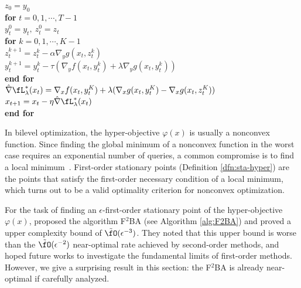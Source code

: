 \documentclass{article}
\begin{document}
\begin{algorithm*}[t]  
\caption{F${}^2$BA $\left(x_0,y_0, \eta,\tau,\alpha, \lambda, T,K\right)$} \label{alg:F2BA}
\begin{algorithmic}[1] 
\STATE $ z_0 = y_0$ \\[1mm]
\STATE \textbf{for} $ t =0,1,\cdots,T-1 $ \\[1mm]
\STATE \quad $ y_t^0 =  y_{t}, ~ z_t^0 = z_{t}$ \\[1mm]
\STATE \quad \textbf{for} $ k =0,1,\cdots,K-1$ \\[1mm]
\STATE \quad \quad $ z_t^{k+1} = z_t^{k}- \alpha \nabla_y g(x_t, z_t^k)   $ \\[1mm]
\STATE \quad \quad $ y_t^{k+1} = y_t^k - \tau \left( \nabla_y f(x_t,y_t^k) +  \lambda  \nabla_y g(x_t,y_t^k) \right)$ \\[1mm]
\STATE \quad \textbf{end for} \\[1mm]
\STATE \quad $ \hat \nabla \fL_{\lambda}^*(x_t)= \nabla_x f(x_t,y_{t}^K) + \lambda ( \nabla_x g(x_t,y_{t}^K) - \nabla_x g(x_t,z_{t}^K) )$ \\[1mm]
\STATE \quad  $x_{t+1} = x_t -  \eta  \hat \nabla \fL_{\lambda}^*(x_t)$ \\[1mm]
\STATE \textbf{end for} \\[1mm]
\end{algorithmic}
\end{algorithm*}

In bilevel optimization, the hyper-objective $\varphi(x)$ is usually a nonconvex function. Since finding the global minimum of a nonconvex function in the worst case requires an exponential number of
queries, a common compromise is to find a local minimum~\citep{ge2016matrix}. First-order stationary points (Definition \ref{dfn:sta-hyper}) are the points that satisfy the first-order necessary condition of a local minimum, which turns out to be a valid optimality criterion for nonconvex optimization.

For the task of finding an $\epsilon$-first-order stationary point of the hyper-objective $\varphi(x)$, 
\citet{kwon2023fully} proposed the algorithm F${}^2$BA (see Algorithm \ref{alg:F2BA}) and proved a upper complexity bound of $\tilde \fO(\epsilon^{-3})$. They noted that this upper bound is worse than the $\tilde \fO(\epsilon^{-2})$ near-optimal rate achieved by second-order methods, and hoped future works to investigate the fundamental limits of first-order methods. However, we give a surprising result in this section: the F${}^2$BA is already near-optimal if carefully analyzed.
\end{document}
